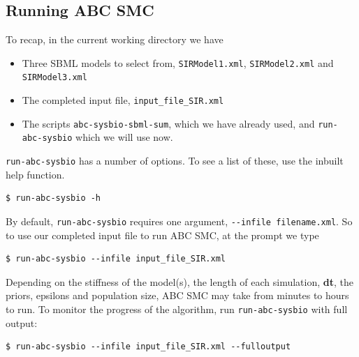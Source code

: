 \documentclass[a4paper]{report}
\begin{document}
\subsection{Running ABC SMC}
To recap, in the current working directory we have
\begin{itemize}
\item Three SBML models to select from, \verb$SIRModel1.xml$, \verb$SIRModel2.xml$ and \verb$SIRModel3.xml$
\item The completed input file, \verb$input_file_SIR.xml$
\item The scripts \verb$abc-sysbio-sbml-sum$, which we have already used, and \verb$run-abc-sysbio$ which we will use now.
\end{itemize}
\verb$run-abc-sysbio$ has a number of options. To see a list of these, use the inbuilt help function.
\begin{verbatim}
$ run-abc-sysbio -h
\end{verbatim}
By default, \verb$run-abc-sysbio$ requires one argument, \verb$--infile filename.xml$. So to use our completed input file to run ABC SMC, at the prompt we type
\begin{verbatim}
$ run-abc-sysbio --infile input_file_SIR.xml
\end{verbatim}
Depending on the stiffness of the model(s), the length of each simulation, \textbf{dt}, the priors, epsilons and population size, ABC SMC may take from minutes to hours to run. To monitor the progress of the algorithm, run \verb$run-abc-sysbio$ with full output:
\begin{verbatim}
$ run-abc-sysbio --infile input_file_SIR.xml --fulloutput
\end{verbatim}
\end{document}
